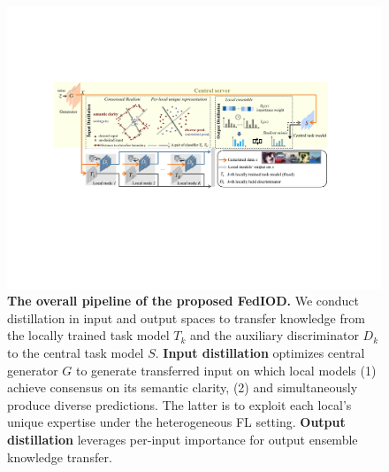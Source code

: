 \documentclass[letterpaper]{article} %
\begin{document}
\begin{figure}
\centering
\includegraphics[width=\linewidth]{fig/fig2_new.pdf}
\caption{\textbf{The overall pipeline of the proposed FedIOD.} We conduct distillation in input and output spaces to transfer knowledge from the locally trained task model $T_k$ and the auxiliary discriminator $D_k$ to the central task model $S$. \textbf{Input distillation} optimizes central generator $G$ to generate transferred input on which local models (1) achieve consensus on its semantic clarity,
(2) and simultaneously produce diverse predictions. The latter is to exploit each local's unique expertise under the heterogeneous FL setting.
\textbf{Output distillation} leverages per-input importance for output ensemble knowledge transfer.
}
\label{fig2}
\end{figure}
\end{document}
